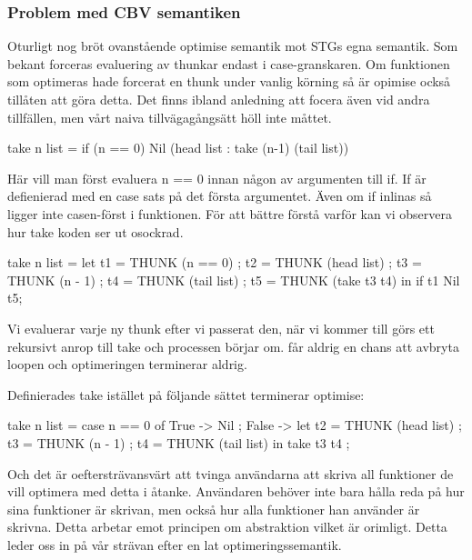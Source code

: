 \documentclass[../Optimise]{subfiles}
\begin{document}

\subsubsection{Problem med CBV semantiken}

Oturligt nog bröt ovanstående optimise semantik mot STGs egna semantik. 
Som bekant forceras evaluering av thunkar endast i case-granskaren. 
Om funktionen som optimeras hade forcerat en thunk under vanlig körning så är
 opimise också tillåten att göra detta. Det finns ibland anledning att focera
 även vid andra tillfällen, men vårt naiva tillvägagångsätt höll inte måttet.

\begin{codeEx}
take n list = if (n == 0) Nil (head list : take (n-1) (tail list))
\end{codeEx}
Här vill man först evaluera n == 0 innan någon av argumenten till if.
If är defienierad med en case sats på det första argumentet. Även om
if inlinas så ligger inte casen-först i funktionen. För att bättre förstå varför kan vi observera hur take koden ser ut osockrad. 

\begin{codeEx}
take n list = let 
    { t1 = THUNK (n == 0)
    ; t2 = THUNK (head list)
    ; t3 = THUNK (n - 1)
    ; t4 = THUNK (tail list)
    ; t5 = THUNK (take t3 t4)
    } in  if t1 Nil t5;
\end{codeEx}

Vi evaluerar varje ny thunk efter vi passerat den, när vi kommer till 
 görs ett rekursivt anrop till take och processen börjar om.
 får aldrig en chans att avbryta loopen och optimeringen terminerar aldrig.

Definierades take istället på följande sättet terminerar optimise:

\begin{codeEx}
take n list = case n == 0 of
    { True -> Nil
    ; False -> let 
        { t2 = THUNK (head list)
        ; t3 = THUNK (n - 1)
        ; t4 = THUNK (tail list)
        } in  take t3 t4
    };
\end{codeEx}


Och det är oeftersträvansvärt att tvinga användarna att skriva all funktioner
de vill optimera med detta i åtanke. Användaren behöver inte bara hålla reda på 
hur sina funktioner är skrivan, men också hur alla funktioner han använder är skrivna. 
Detta arbetar emot principen om abstraktion vilket är orimligt. Detta leder oss in på vår strävan
efter en lat optimeringssemantik.
\end{document}
